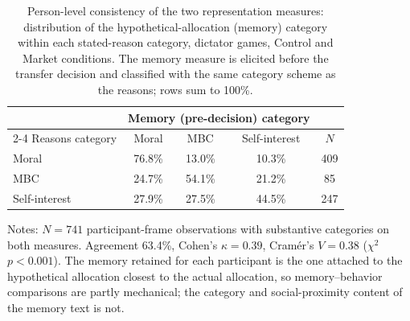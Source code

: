 \begin{table}[htbp]
\centering
\caption{Person-level consistency of the two representation measures: distribution of the hypothetical-allocation (memory) category within each stated-reason category, dictator games, Control and Market conditions. The memory measure is elicited before the transfer decision and classified with the same category scheme as the reasons; rows sum to 100\%.}
\label{tab:hp_person_level}
\begin{tabular}{lcccc}
\toprule
 & \multicolumn{3}{c}{Memory (pre-decision) category} & \\
\cmidrule(lr){2-4}
Reasons category & Moral & MBC & Self-interest & $N$ \\ \midrule
Moral & 76.8\% & 13.0\% & 10.3\% & 409 \\
MBC & 24.7\% & 54.1\% & 21.2\% & 85 \\
Self-interest & 27.9\% & 27.5\% & 44.5\% & 247 \\
\bottomrule
\end{tabular}
\begin{flushleft}
\footnotesize Notes: $N=741$ participant-frame observations with substantive categories on both measures. Agreement 63.4\%, Cohen's $\kappa=0.39$, Cram\'er's $V=0.38$ ($\chi^2$ $p<0.001$). The memory retained for each participant is the one attached to the hypothetical allocation closest to the actual allocation, so memory--behavior comparisons are partly mechanical; the category and social-proximity content of the memory text is not.
\end{flushleft}
\end{table}

